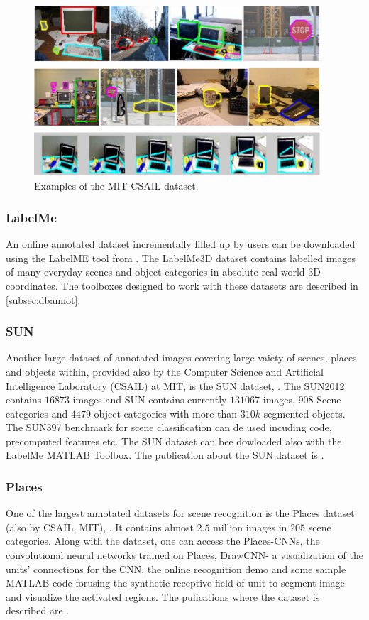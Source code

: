\begin{figure}[H]
\begin{center}
\includegraphics[width=0.95\textwidth]{fig/MIT-CSAIL}
\end{center}
\caption{Examples of the MIT-CSAIL dataset.}
\label{fig:mit-csail}
\end{figure}

\subsubsection{LabelMe}
An online annotated dataset incrementally filled up by users can be downloaded using the LabelME tool from \cite{labelme_db}. The LabelMe3D dataset contains labelled images of many everyday scenes and object categories in absolute real world 3D coordinates. The toolboxes designed to work with these datasets are described in \ref{subsec:dbannot}.

\subsubsection{SUN}
Another large dataset of annotated images covering large vaiety of scenes, places and objects within, provided also by the Computer Science and Artificial Intelligence Laboratory (CSAIL) at MIT, is the SUN dataset, \cite{sun_db}. The SUN2012 contains $16 873$ images and SUN contains currently $131067$ images, $908$ Scene categories and $4479$ object categories with more than $310k$ segmented objects. The SUN397 benchmark for scene classification can de used incuding code, precomputed features etc. The SUN dataset can bee dowloaded also with the LabelMe MATLAB Toolbox. The publication about the SUN dataset is \cite{Xiao2010}.

\subsubsection{Places}
One of the largest annotated datasets for scene recognition is the Places dataset (also by CSAIL, MIT), \cite{places_db}. It contains almost $2.5$ million images in $205$ scene categories. Along with the dataset, one can access the Places-CNNs, the convolutional neural networks trained on Places, DrawCNN- a visualization of the units' connections for the CNN, the online recognition demo and some sample MATLAB code forusing the synthetic receptive field of unit to segment image and visualize the activated regions. The pulications where the dataset is described are \cite{Zhou2014, Zhou2015}.